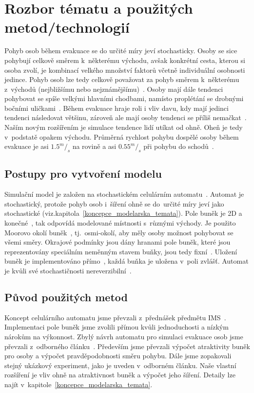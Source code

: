 \documentclass[11pt, titlepage, a4paper]{article}
\begin{document}
\section{Rozbor tématu a použitých metod/technologií}
\label{rozbor_tematu_a_pouzitych_metod}
Pohyb osob během evakuace se do určité míry jeví stochasticky. Osoby se sice pohybují celkově směrem k~některému východu, avšak konkrétní cesta, kterou si osoba zvolí, je kombinací velkého množství faktorů včetně individuální osobnosti jedince. Pohyb osob lze tedy celkově považovat za pohyb směrem k~některému z~východů (nejbližšímu nebo nejznámějšímu)~\cite{source_CA}. Osoby mají dále tendenci pohybovat se spíše velkými hlavními chodbami, namísto proplétání se drobnými bočními uličkami~\cite{source_CA}. Během evakuace hraje roli i vliv davu, kdy mají jedinci tendenci následovat většinu, zároveň ale mají osoby tendenci se příliš nemačkat~\cite{source_CA}. Naším novým rozšířením je simulace tendence lidí utíkat od ohně. Oheň je tedy v~podstatě opakem východu. Průměrná rychlost pohybu dospělé osoby během evakuace je asi $1.5^m/_s$ na rovině a asi $0.55^m/_s$ při pohybu do schodů~\cite{walk_speed}.

    \subsection{Postupy pro vytvoření modelu}
    Simulační model je založen na stochastickém celulárním automatu~\cite[s.~316]{IMS}. Automat je stochastický, protože pohyb osob i~šíření ohně se do~určité míry jeví jako stochastické (viz.kapitola~\ref{koncepce_modelarska_temata}). Pole buněk je 2D a konečné~\cite[s.~317]{IMS}, tak odpovídá modelované místnosti s~různými východy. Je použito Moorovo okolí buněk~\cite[s.~318]{IMS}, tj.~osmi-okolí, aby měly osoby možnost pohybovat se všemi směry. Okrajové podmínky jsou dány hranami pole buněk, které jsou reprezentovány speciálním neměnným stavem buňky, jsou tedy fixní~\cite[s.~320]{IMS}. Uložení buněk je implementováno přímo~\cite[s.~321]{IMS}, každá buňka je uložena v~poli zvlášť. Automat je kvůli své stochastičnosti nereverzibilní~\cite[s.~328]{IMS}.

    \subsection{Původ použitých metod}
    Koncept celulárního automatu jsme převzali z~přednášek předmětu IMS~\cite{IMS}. Implementaci pole buněk jsme zvolili přímou kvůli jednoduchosti a nízkým nárokům na výkonnost. Zbylý návrh automatu pro simulaci evakuace osob jsme převzali z~odborného článku~\cite{source_CA}. Především jsme převzali výpočet atraktivity buněk pro osoby a výpočet pravděpodobnosti směru pohybu. Dále jsme zopakovali stejný ukázkový experiment, jako je uveden v~odborném článku. Naše vlastní rozšíření je vliv ohně na atraktivnost buněk a výpočet jeho šíření. Detaily lze najít v~kapitole~\ref{koncepce_modelarska_temata}.
\end{document}
